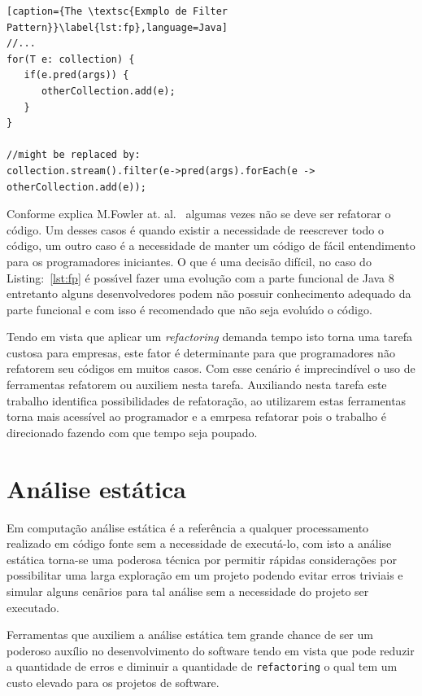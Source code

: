 \begin{lstlisting}[caption={The \textsc{Exmplo de Filter Pattern}}\label{lst:fp},language=Java] 
//...
for(T e: collection) {
   if(e.pred(args)) {
      otherCollection.add(e);
   }
}

//might be replaced by:
collection.stream().filter(e->pred(args).forEach(e -> otherCollection.add(e));
\end{lstlisting}


Conforme explica M.Fowler at. al.~\cite{martinFowlerRafactoring} algumas vezes n\~{a}o se deve ser refatorar o c\'{o}digo. Um desses casos \'{e} quando existir a necessidade de reescrever todo o c\'{o}digo, um outro caso \'{e} a necessidade de manter um  c\'{o}digo de f\'{a}cil entendimento para os programadores iniciantes. O que \'{e} uma decis\~{a}o dif\'{i}cil, no caso do Listing:~\ref{lst:fp} \'{e} poss\'{\i}vel fazer uma evolu\c{c}\~{a}o com a parte funcional de Java 8 entretanto alguns desenvolvedores podem n\~{a}o possuir  conhecimento adequado da parte funcional e com isso \'{e} recomendado que n\~{a}o seja evolu\'{\i}do o c\'{o}digo.


Tendo em vista que aplicar um \textit{refactoring} demanda tempo isto torna uma tarefa custosa para empresas, este fator \'{e} determinante para que programadores n\~{a}o refatorem seu c\'{o}digos em muitos casos. Com esse cen\'{a}rio \'{e} imprecind\'{i}vel o uso de ferramentas refatorem ou auxiliem nesta tarefa. Auxiliando nesta tarefa este trabalho identifica possibilidades de refatora\c{c}\~{a}o, ao utilizarem estas ferramentas torna mais acessível ao programador e a emrpesa refatorar pois o trabalho é direcionado fazendo com que tempo seja poupado.



\section{Análise estática}\label{sec:as}

Em computa\c{c}\~{a}o an\'{a}lise est\'{a}tica \'{e} a refer\^{e}ncia a qualquer processamento realizado em c\'{o}digo fonte sem a necessidade de execut\'{a}-lo, com isto a an\'{a}lise est\'{a}tica torna-se uma poderosa t\'{e}cnica por permitir r\'{a}pidas considera\c{c}\~{o}es por possibilitar uma larga explora\c{c}\~{a}o em um projeto podendo evitar erros triviais e simular alguns cen\~{a}rios para tal an\'{a}lise sem a necessidade do projeto ser executado.

Ferramentas que auxiliem a an\'{a}lise est\'{a}tica tem grande chance de ser um poderoso aux\'{i}lio no desenvolvimento do software tendo em vista que pode reduzir a quantidade de erros e diminuir a quantidade de \texttt{refactoring} o qual tem um custo elevado para os projetos de software.


